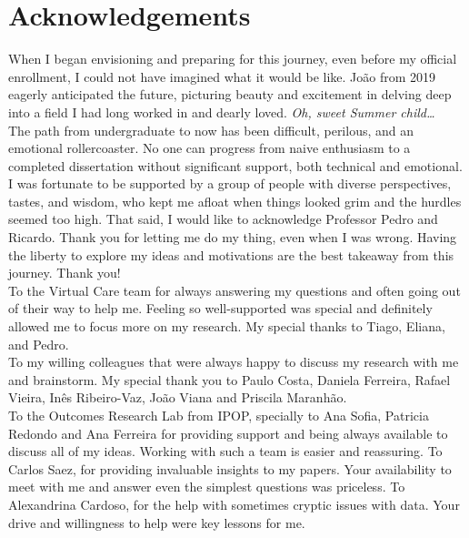 \chapter*{Acknowledgements}

When I began envisioning and preparing for this journey, even before my official enrollment, I could not have imagined what it would be like. João from 2019 eagerly anticipated the future, picturing beauty and excitement in delving deep into a field I had long worked in and dearly loved. 
 \textit{Oh, sweet Summer child…} \\

The path from undergraduate to now has been difficult, perilous, and an emotional rollercoaster. No one can progress from naive enthusiasm to a completed dissertation without significant support, both technical and emotional. I was fortunate to be supported by a group of people with diverse perspectives, tastes, and wisdom, who kept me afloat when things looked grim and the hurdles seemed too high. 
That said, I would like to acknowledge Professor Pedro and Ricardo.  Thank you for letting me do my thing, even when I was wrong. Having the liberty to explore my ideas and motivations are the best takeaway from this journey. Thank you! \\

To the Virtual Care team for always answering my questions and often going out of their way to help me. Feeling so well-supported was special and definitely allowed me to focus more on my research. My special thanks to Tiago, Eliana, and Pedro. \\

To my willing colleagues that were always happy to discuss my research with me and brainstorm. My special thank you to Paulo Costa, Daniela Ferreira, Rafael Vieira, Inês Ribeiro-Vaz, João Viana and Priscila Maranhão. \\

To the Outcomes Research Lab from IPOP, specially to Ana Sofia, Patricia Redondo and Ana Ferreira for providing support and being always available to discuss all of my ideas. Working with such a team is easier and reassuring. To Carlos Saez, for providing invaluable insights to my papers. Your availability to meet with me and answer even the simplest questions was priceless. To Alexandrina Cardoso, for the help with sometimes cryptic issues with data. Your drive and willingness to help were key lessons for me. \\

